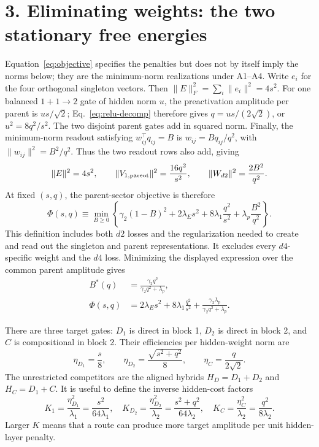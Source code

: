 \documentclass[10pt]{article}
\begin{document}
\section*{3. Eliminating weights: the two stationary free energies}
Equation~\eqref{eq:objective} specifies the penalties but does not by itself imply the norms
below; they are the minimum-norm realizations under A1--A4.  Write $e_i$ for the four
orthogonal singleton vectors.  Then $\|E\|_F^2=\sum_i\|e_i\|^2=4s^2$.  For one balanced
$1+1\to2$ gate of hidden norm $u$, the preactivation amplitude per parent is $us/\sqrt2$;
Eq.~\eqref{eq:relu-decomp} therefore gives $q=us/(2\sqrt2)$, or
$u^2=8q^2/s^2$.  The two disjoint parent gates add in squared norm.  Finally, the
minimum-norm readout satisfying $w_{ij}^{\top}q_{ij}=B$ is
$w_{ij}=Bq_{ij}/q^2$, with $\|w_{ij}\|^2=B^2/q^2$.  Thus the two readout rows also add, giving
\begin{equation}
\|E\|^2=4s^2,\qquad
\|V_{1,\rm parent}\|^2=\frac{16q^2}{s^2},\qquad
\|W_{d2}\|^2=\frac{2B^2}{q^2}.
\end{equation}
At fixed $(s,q)$, the parent-sector objective is therefore
\begin{equation}
\Phi(s,q)\equiv\min_{B\geq0}\left\{
\gamma_2(1-B)^2+2\lambda_Es^2+8\lambda_1\frac{q^2}{s^2}
+\lambda_p\frac{B^2}{q^2}\right\}.
\label{eq:phi-definition}
\end{equation}
This definition includes both $d2$ losses and the regularization needed to create and read out
the singleton and parent representations.  It excludes every $d4$-specific weight and the
$d4$ loss.  Minimizing the displayed expression over the common parent amplitude gives
\begin{align}
B^*(q)&=\frac{\gamma_2q^2}{\gamma_2q^2+\lambda_p},\nonumber\\[-2pt]
\Phi(s,q)&=2\lambda_Es^2+8\lambda_1\frac{q^2}{s^2}
+\frac{\gamma_2\lambda_p}{\gamma_2q^2+\lambda_p}.
\label{eq:parent-free}
\end{align}

There are three target gates: $D_1$ is direct in block 1, $D_2$ is direct in block 2, and
$C$ is compositional in block 2.  Their efficiencies per hidden-weight norm are
\begin{equation}
\eta_{D_1}=\frac{s}{8},\qquad
\eta_{D_2}=\frac{\sqrt{s^2+q^2}}{8},\qquad
\eta_C=\frac{q}{2\sqrt2}.
\label{eq:etas}
\end{equation}
The unrestricted competitors are the aligned hybrids $H_D=D_1+D_2$ and $H_C=D_1+C$.
It is useful to define the inverse hidden-cost factors
\begin{equation}
K_1=\frac{\eta_{D_1}^2}{\lambda_1}=\frac{s^2}{64\lambda_1},\quad
K_{D_2}=\frac{\eta_{D_2}^2}{\lambda_2}=\frac{s^2+q^2}{64\lambda_2},\quad
K_C=\frac{\eta_C^2}{\lambda_2}=\frac{q^2}{8\lambda_2}.
\label{eq:k-factors}
\end{equation}
Larger $K$ means that a route can produce more target amplitude per unit hidden-layer penalty.
\end{document}
